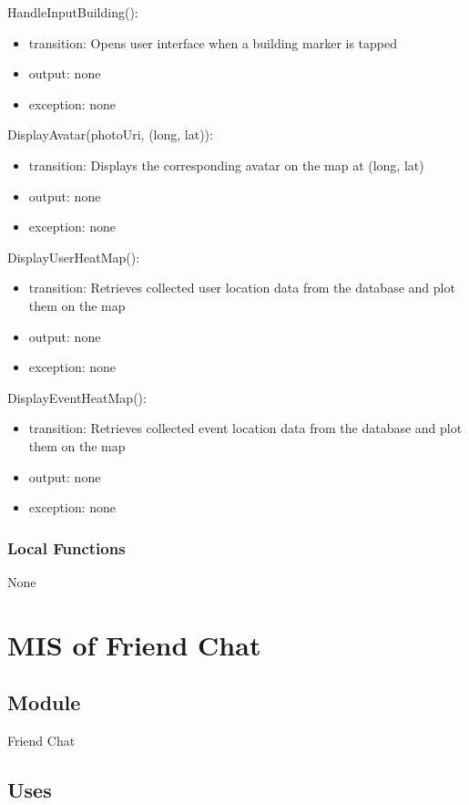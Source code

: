 \documentclass[12pt, titlepage]{article}
\begin{document}
\noindent HandleInputBuilding():
\begin{itemize}
\item transition: Opens user interface when a building marker is tapped
\item output: none
\item exception: none
\end{itemize}

\noindent DisplayAvatar(photoUri, (long, lat)):
\begin{itemize}
\item transition: Displays the corresponding avatar on the map at (long, lat)
\item output: none
\item exception: none
\end{itemize}

\noindent DisplayUserHeatMap():
\begin{itemize}
\item transition: Retrieves collected user location data from the database and plot them on the map
\item output: none
\item exception: none
\end{itemize}

\noindent DisplayEventHeatMap():
\begin{itemize}
\item transition: Retrieves collected event location data from the database and plot them on the map
\item output: none
\item exception: none
\end{itemize}

\subsubsection{Local Functions}

None

\newpage

\section{MIS of Friend Chat} \label{mFC}

\subsection{Module}

Friend Chat

\subsection{Uses}
\end{document}
